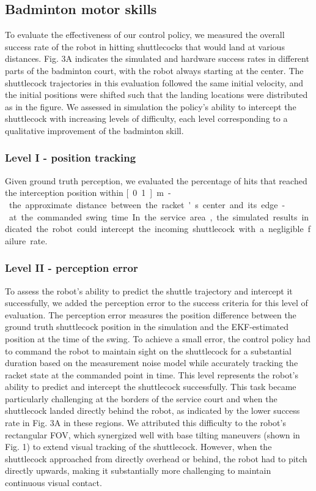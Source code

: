 \documentclass[9pt,twocolumn,twoside]{osajnl}
\begin{document}
\subsection*{Badminton motor skills}



To evaluate the effectiveness of our control policy, we measured the overall success rate of the robot in hitting shuttlecocks that would land at various distances. Fig. 3A indicates the simulated and hardware success rates in different parts of the badminton court, with the robot always starting at the center. The shuttlecock trajectories in this evaluation followed the same initial velocity, and the initial positions were shifted such that the landing locations were distributed as in the figure. We assessed in simulation the policy's ability to intercept the shuttlecock with increasing levels of difficulty, each level corresponding to a qualitative improvement of the badminton skill.

\subsubsection*{Level I - position tracking}
Given ground truth perception, we evaluated the percentage of hits that reached the interception position within \unit[0.1]{m} - the approximate distance between the racket's center and its edge - at the commanded swing time. In the service area, the simulated results indicated the robot could intercept the incoming shuttlecock with a negligible failure rate.

\subsubsection*{Level II - perception error}
To assess the robot's ability to predict the shuttle trajectory and intercept it successfully, we added the perception error to the success criteria for this level of evaluation. The perception error measures the position difference between the ground truth shuttlecock position in the simulation and the \ac{EKF}-estimated position at the time of the swing. To achieve a small error, the control policy had to command the robot to maintain sight on the shuttlecock for a substantial duration based on the measurement noise model while accurately tracking the racket state at the commanded point in time. This level represents the robot's ability to predict and intercept the shuttlecock successfully. This task became particularly challenging at the borders of the service court and when the shuttlecock landed directly behind the robot, as indicated by the lower success rate in Fig. 3A in these regions. We attributed this difficulty to the robot's rectangular FOV, which synergized well with base tilting maneuvers (shown in Fig. 1) to extend visual tracking of the shuttlecock. However, when the shuttlecock approached from directly overhead or behind, the robot had to pitch directly upwards, making it substantially more challenging to maintain continuous visual contact.
\end{document}

